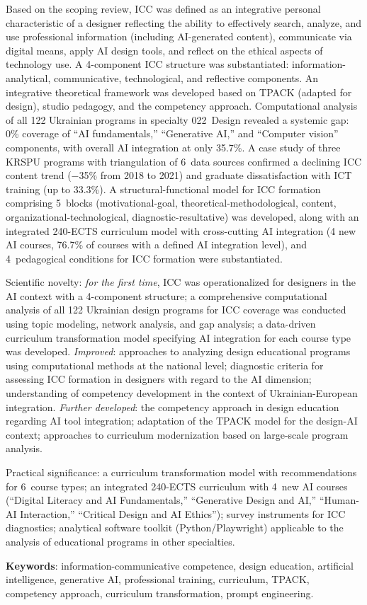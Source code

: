 Based on the scoping review, ICC was defined as an integrative personal characteristic of a designer reflecting the ability to effectively search, analyze, and use professional information (including AI-generated content), communicate via digital means, apply AI design tools, and reflect on the ethical aspects of technology use. A 4-component ICC structure was substantiated: information-analytical, communicative, technological, and reflective components. An integrative theoretical framework was developed based on TPACK (adapted for design), studio pedagogy, and the competency approach. Computational analysis of all 122 Ukrainian programs in specialty 022~Design revealed a systemic gap: 0\% coverage of ``AI fundamentals,'' ``Generative AI,'' and ``Computer vision'' components, with overall AI integration at only 35.7\%. A case study of three KRSPU programs with triangulation of 6~data sources confirmed a declining ICC content trend ($-$35\% from 2018 to 2021) and graduate dissatisfaction with ICT training (up to 33.3\%). A structural-functional model for ICC formation comprising 5~blocks (motivational-goal, theoretical-methodological, content, organizational-technological, diagnostic-resultative) was developed, along with an integrated 240-ECTS curriculum model with cross-cutting AI integration (4 new AI courses, 76.7\% of courses with a defined AI integration level), and 4~pedagogical conditions for ICC formation were substantiated.

Scientific novelty: \textit{for the first time}, ICC was operationalized for designers in the AI context with a 4-component structure; a comprehensive computational analysis of all 122 Ukrainian design programs for ICC coverage was conducted using topic modeling, network analysis, and gap analysis; a data-driven curriculum transformation model specifying AI integration for each course type was developed. \textit{Improved}: approaches to analyzing design educational programs using computational methods at the national level; diagnostic criteria for assessing ICC formation in designers with regard to the AI dimension; understanding of competency development in the context of Ukrainian-European integration. \textit{Further developed}: the competency approach in design education regarding AI tool integration; adaptation of the TPACK model for the design-AI context; approaches to curriculum modernization based on large-scale program analysis.

Practical significance: a curriculum transformation model with recommendations for 6~course types; an integrated 240-ECTS curriculum with 4~new AI courses (``Digital Literacy and AI Fundamentals,'' ``Generative Design and AI,'' ``Human-AI Interaction,'' ``Critical Design and AI Ethics''); survey instruments for ICC diagnostics; analytical software toolkit (Python/Playwright) applicable to the analysis of educational programs in other specialties.

\textbf{Keywords}: information-communicative competence, design education, artificial intelligence, generative AI, professional training, curriculum, TPACK, competency approach, curriculum transformation, prompt engineering.

\printpratsi{}
